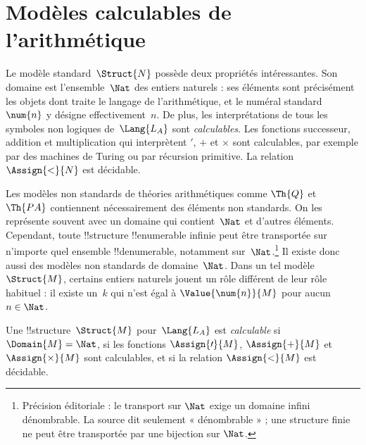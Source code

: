 \documentclass[../../../include/open-logic-section]{subfiles}
\begin{document}
\section{Modèles calculables de l'arithmétique}

\begin{explain}
Le modèle standard~$\Struct{N}$ possède
deux propriétés intéressantes. Son domaine
est l'ensemble~$\Nat$ des entiers naturels :
ses éléments sont précisément les objets
dont traite le langage de l'arithmétique,
et le numéral standard~$\num{n}$ y désigne
effectivement~$n$. De plus, les
interprétations de tous les symboles
non logiques de~$\Lang{L_A}$ sont
\emph{calculables}. Les fonctions
successeur, addition et multiplication
qui interprètent $\prime$, $+$ et
$\times$ sont calculables, par exemple
par des machines de Turing ou par
récursion primitive. La relation
$\Assign{<}{N}$ est décidable.

Les modèles non standards de théories
arithmétiques comme $\Th{Q}$ et $\Th{PA}$
contiennent nécessairement des éléments
non standards. On les représente souvent
avec un domaine qui contient~$\Nat$
et d'autres éléments. Cependant, toute
!!{structure} !!{enumerable} infinie
peut être transportée sur n'importe
quel ensemble !!{denumerable}, notamment
sur~$\Nat$.\footnote{Précision éditoriale : le transport sur $\Nat$ exige un domaine infini dénombrable. La source dit seulement « dénombrable » ; une structure finie ne peut être transportée par une bijection sur $\Nat$.} Il existe donc aussi des
modèles non standards de domaine~$\Nat$.
Dans un tel modèle~$\Struct{M}$, certains
entiers naturels jouent un rôle différent
de leur rôle habituel : il existe un~$k$
qui n'est égal à
$\Value{\num{n}}{M}$ pour aucun
$n\in\Nat$.
\end{explain}

\begin{defn}
Une !!{structure}~$\Struct{M}$
pour~$\Lang{L_A}$ est \emph{calculable}
si $\Domain{M}=\Nat$, si les fonctions
$\Assign{\prime}{M}$,
$\Assign{+}{M}$ et
$\Assign{\times}{M}$ sont calculables,
et si la relation $\Assign{<}{M}$
est décidable.
\end{defn}
\end{document}
